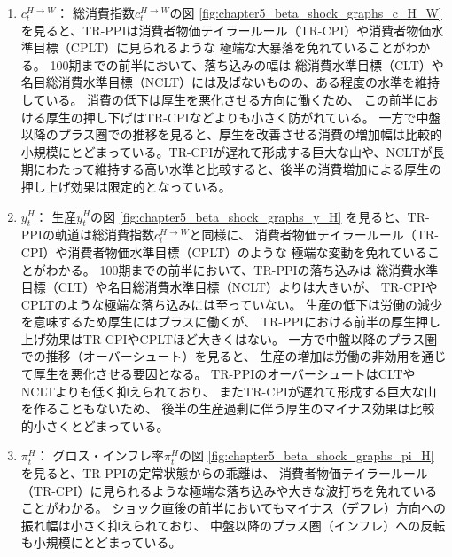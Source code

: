 \begin{enumerate}
    \item
    \label{itm:chapter5_beta_shock_policies_tr_ppi_c_H_W}
        \(c_t^{H\to W}\)：
        総消費指数\(c_t^{H\to W}\)の図
        \ref{fig:chapter5_beta_shock_graphs_c_H_W}
        を見ると、TR-PPIは消費者物価テイラールール（TR-CPI）や消費者物価水準目標（CPLT）に見られるような
        極端な大暴落を免れていることがわかる。
        100期までの前半において、落ち込みの幅は
        総消費水準目標（CLT）や名目総消費水準目標（NCLT）には及ばないものの、ある程度の水準を維持している。
        消費の低下は厚生を悪化させる方向に働くため、
        この前半における厚生の押し下げはTR-CPIなどよりも小さく防がれている。
        一方で中盤以降のプラス圏での推移を見ると、厚生を改善させる消費の増加幅は比較的小規模にとどまっている。TR-CPIが遅れて形成する巨大な山や、NCLTが長期にわたって維持する高い水準と比較すると、後半の消費増加による厚生の押し上げ効果は限定的となっている。
    \item
    \label{itm:chapter5_beta_shock_policies_tr_ppi_y_H}
        \(y_t^H\)：
        生産\(y_t^H\)の図
        \ref{fig:chapter5_beta_shock_graphs_y_H}
        を見ると、TR-PPIの軌道は総消費指数\(c_t^{H\to W}\)と同様に、
        消費者物価テイラールール（TR-CPI）や消費者物価水準目標（CPLT）のような
        極端な変動を免れていることがわかる。
        100期までの前半において、TR-PPIの落ち込みは
        総消費水準目標（CLT）や名目総消費水準目標（NCLT）よりは大きいが、
        TR-CPIやCPLTのような極端な落ち込みには至っていない。
        生産の低下は労働の減少を意味するため厚生にはプラスに働くが、
        TR-PPIにおける前半の厚生押し上げ効果はTR-CPIやCPLTほど大きくはない。
        一方で中盤以降のプラス圏での推移（オーバーシュート）を見ると、
        生産の増加は労働の非効用を通じて厚生を悪化させる要因となる。
        TR-PPIのオーバーシュートはCLTやNCLTよりも低く抑えられており、
        またTR-CPIが遅れて形成する巨大な山を作ることもないため、
        後半の生産過剰に伴う厚生のマイナス効果は比較的小さくとどまっている。
    \item
    \label{itm:chapter5_beta_shock_policies_tr_ppi_pi_H}
        \(\pi_t^H\)：
        グロス・インフレ率\(\pi_t^H\)の図
        \ref{fig:chapter5_beta_shock_graphs_pi_H}
        を見ると、TR-PPIの定常状態からの乖離は、
        消費者物価テイラールール（TR-CPI）に見られるような極端な落ち込みや大きな波打ちを免れていることがわかる。
        ショック直後の前半においてもマイナス（デフレ）方向への振れ幅は小さく抑えられており、
        中盤以降のプラス圏（インフレ）への反転も小規模にとどまっている。

\end{enumerate}

